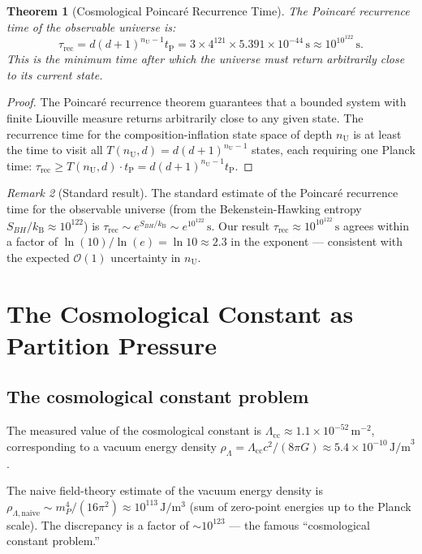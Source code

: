 \documentclass[twocolumn,10pt,a4paper]{article}
\theoremstyle{thmstyle}
\newtheorem{theorem}{Theorem}[section]
\theoremstyle{definition}
\theoremstyle{remark}
\newtheorem{remark}[theorem]{Remark}
\newcommand{\kB}{k_{\mathrm{B}}}
\newcommand{\nU}{n_{\mathrm{U}}}
\newcommand{\tP}{t_{\mathrm{P}}}
\newcommand{\LambdaCC}{\Lambda_{\mathrm{cc}}}
\begin{document}
\begin{theorem}[Cosmological Poincar\'e Recurrence Time]
\label{thm:recurrence}
The Poincar\'e recurrence time of the observable universe is:
\begin{equation}
\tau_{\mathrm{rec}} = d(d+1)^{\nU-1}\tP
= 3\times4^{121}\times5.391\times10^{-44}\,\mathrm{s}
\approx 10^{10^{122}}\,\mathrm{s}.
\label{eq:tau_rec}
\end{equation}
This is the minimum time after which the universe must return
arbitrarily close to its current state.
\end{theorem}

\begin{proof}
The Poincar\'e recurrence theorem guarantees that a bounded system
with finite Liouville measure returns arbitrarily close to any given
state. The recurrence time for the composition-inflation state space
of depth $\nU$ is at least the time to visit all $T(\nU, d) = d(d+1)^{\nU-1}$
states, each requiring one Planck time:
$\tau_{\mathrm{rec}} \geq T(\nU,d)\cdot\tP = d(d+1)^{\nU-1}\tP$.
\end{proof}

\begin{remark}[Standard result]
The standard estimate of the Poincar\'e recurrence time for the
observable universe (from the Bekenstein-Hawking entropy $S_{BH}/\kB
\approx 10^{122}$) is $\tau_{\mathrm{rec}} \sim e^{S_{BH}/\kB}
\sim e^{10^{122}}\,\mathrm{s}$. Our result
$\tau_{\mathrm{rec}} \approx 10^{10^{122}}\,\mathrm{s}$ agrees within
a factor of $\ln(10)/\ln(e) = \ln 10 \approx 2.3$ in the exponent ---
consistent with the expected $\mathcal{O}(1)$ uncertainty in $\nU$.
\end{remark}

\section{The Cosmological Constant as Partition Pressure}
\label{sec:cc}

\subsection{The cosmological constant problem}

The measured value of the cosmological constant is
$\LambdaCC \approx 1.1\times10^{-52}\,\mathrm{m}^{-2}$, corresponding to
a vacuum energy density $\rho_\Lambda = \LambdaCC c^2/(8\pi G)
\approx 5.4\times10^{-10}\,\mathrm{J/m}^3$.

The naive field-theory estimate of the vacuum energy density is
$\rho_{\Lambda,\mathrm{naive}} \sim m_P^4/(16\pi^2) \approx 10^{113}\,\mathrm{J/m^3}$
(sum of zero-point energies up to the Planck scale). The discrepancy is
a factor of $\sim 10^{123}$ --- the famous ``cosmological constant problem.''
\end{document}
